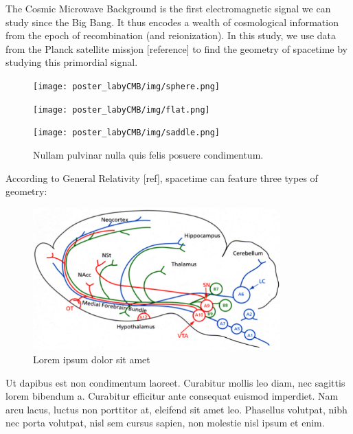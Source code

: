 The Cosmic Microwave Background is the first electromagnetic signal we can study since the Big Bang. It thus encodes a wealth of cosmological information from the epoch of recombination (and reionization). In this study, we use data from the Planck satellite missjon [reference] to find the geometry of spacetime by studying this primordial signal.

\vspace{0.5em}
\begin{figure}
	\begin{minipage}{0.3\textwidth}
		\centering\texttt{[image: poster\_labyCMB/img/sphere.png]}
	\end{minipage}
	\hspace{1em}
	\begin{minipage}{0.3\textwidth}
		\centering\texttt{[image: poster\_labyCMB/img/flat.png]}
		\caption{Nullam pulvinar nulla quis felis posuere condimentum.}
	\end{minipage}
	\hspace{1em}
	\begin{minipage}{0.3\textwidth}
		\centering\texttt{[image: poster\_labyCMB/img/saddle.png]}
	\end{minipage}
\end{figure}

According to General Relativity [ref], spacetime can feature three types of geometry: 

\vspace{0.4em}
\begin{figure}
\begin{minipage}{0.43\textwidth}
	\centering\includegraphics[width=0.85\textwidth]{img/mas.png}
	\caption{Lorem ipsum dolor sit amet \cite{Paivi}}
\end{minipage}
\hspace{1em}
\end{figure}

Ut dapibus est non condimentum laoreet. Curabitur mollis leo diam, nec sagittis lorem bibendum a. Curabitur efficitur ante consequat euismod imperdiet. Nam arcu lacus, luctus non porttitor at, eleifend sit amet leo. Phasellus volutpat, nibh nec porta volutpat, nisl sem cursus sapien, non molestie nisl ipsum et enim.